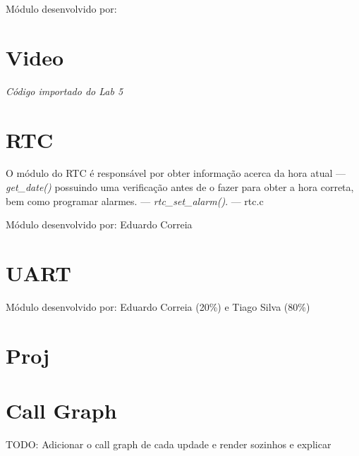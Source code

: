 \documentclass{report}
\begin{document}
Módulo desenvolvido por: 

\section{Video}

\textit{Código importado do Lab 5}\footnotemark[\value{footnote}]


\section{RTC}

O módulo do RTC é responsável por obter informação acerca da hora atual --- \textit{get\_date()} possuindo uma verificação antes de o fazer para obter a hora correta, bem como programar alarmes. --- \textit{rtc\_set\_alarm()}. --- rtc.c \newline

Módulo desenvolvido por: Eduardo Correia

\section{UART}

Módulo desenvolvido por: Eduardo Correia (20\%) e Tiago Silva (80\%)
 
\section{Proj}


\section{Call Graph}

TODO: Adicionar o call graph de cada updade e render sozinhos e explicar
\end{document}
